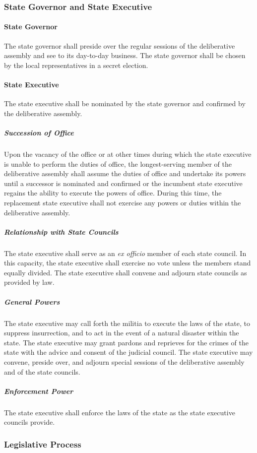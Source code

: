 \documentclass{article}
\begin{document}
\subsubsection{State Governor and State Executive}
\paragraph{State Governor}
The state governor shall preside over the regular sessions of the deliberative assembly and see to its day-to-day business. The state governor shall be chosen by the local representatives in a secret election.
\paragraph{State Executive}
The state executive shall be nominated by the state governor and confirmed by the deliberative assembly.
\subparagraph{Succession of Office}
Upon the vacancy of the office or at other times during which the state executive is unable to perform the duties of office, the longest-serving member of the deliberative assembly shall assume the duties of office and undertake its powers until a successor is nominated and confirmed or the incumbent state executive regains the ability to execute the powers of office. During this time, the replacement state executive shall not exercise any powers or duties within the deliberative assembly.
\subparagraph{Relationship with State Councils}
The state executive shall serve as an \textit{ex officio} member of each state council. In this capacity, the state executive shall exercise no vote unless the members stand equally divided. The state executive shall convene and adjourn state councils as provided by law.
\subparagraph{General Powers}
The state executive may call forth the militia to execute the laws of the state, to suppress insurrection, and to act in the event of a natural disaster within the state. The state executive may grant pardons and reprieves for the crimes of the state with the advice and consent of the judicial council. The state executive may convene, preside over, and adjourn special sessions of the deliberative assembly and of the state councils.
\subparagraph{Enforcement Power}
The state executive shall enforce the laws of the state as the state executive councils provide.
\subsubsection{Legislative Process}
\end{document}
